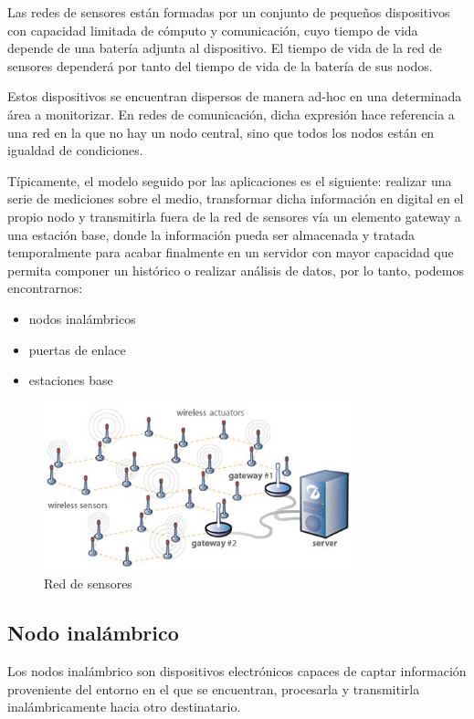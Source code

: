Las redes de sensores est\'an formadas por un conjunto de peque\~nos dispositivos con capacidad limitada de c\'omputo y
comunicaci\'on, cuyo tiempo de vida depende de una bater\'ia adjunta al dispositivo. El tiempo de vida de la red de
sensores depender\'a por tanto del tiempo de vida de la bater\'ia de sus nodos.

Estos dispositivos se encuentran dispersos de manera ad-hoc en una determinada \'area a monitorizar. En redes de
comunicaci\'on, dicha expresi\'on hace referencia a una red en la que no hay un nodo central, sino que todos los nodos
est\'an en igualdad de condiciones.

T\'ipicamente, el modelo seguido por las aplicaciones es el siguiente: realizar una serie de mediciones sobre el medio,
transformar dicha informaci\'on en digital en el propio nodo y transmitirla fuera de la red de sensores v\'ia un elemento
gateway a una estaci\'on base, donde la informaci\'on pueda ser almacenada y tratada temporalmente para acabar finalmente
en un servidor con mayor capacidad que permita componer un hist\'orico o realizar an\'alisis de datos, por lo tanto,
podemos encontrarnos: 

\begin{itemize}
\item nodos inal\'ambricos 
\item puertas de enlace 
\item estaciones base
\end{itemize}

\begin{figure}[htbp]
	\centering
		\includegraphics[width=0.8\textwidth]{imagenes/red_de_sensores.jpg}
	\caption{Red de sensores}
	\label{fig:red_de_sensores}
\end{figure}

 

\subsection{Nodo inal\'ambrico}
Los nodos inal\'ambrico son dispositivos electr\'onicos capaces de captar informaci\'on proveniente del entorno en el que se
encuentran, procesarla y transmitirla inal\'ambricamente hacia otro destinatario. 

